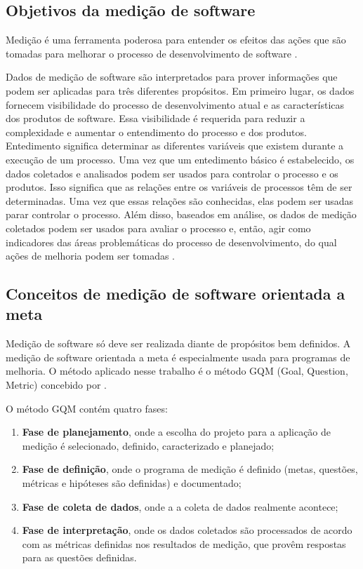 \subsection{Objetivos da medição de software}
Medição é uma ferramenta poderosa para entender os efeitos das ações que são
tomadas para melhorar o processo de desenvolvimento de software
\cite{egon}.

Dados de medição de software são interpretados para prover informações que podem
ser aplicadas para três diferentes propósitos. Em primeiro lugar, os dados
fornecem visibilidade do processo de desenvolvimento atual e as características
dos produtos de software. Essa visibilidade é requerida para reduzir a complexidade
e aumentar o entendimento do processo e dos produtos. Entedimento significa
determinar as diferentes variáveis que existem durante a execução de um processo.
Uma vez que um entedimento básico é estabelecido, os dados coletados e analisados
podem ser usados para controlar o processo e os produtos. Isso significa que as
relações entre os variáveis de processos têm de ser determinadas. Uma vez que
 essas relações são conhecidas, elas podem ser usadas parar controlar o processo.
 Além disso, baseados em análise, os dados de medição coletados podem ser usados
 para avaliar o processo e, então, agir como indicadores das áreas problemáticas
 do processo de desenvolvimento, do qual ações de melhoria podem ser tomadas
 \cite{pfleeger}.

\subsection{Conceitos de medição de software orientada a meta}
Medição de software só deve ser realizada diante de propósitos bem definidos.
A medição de software orientada a meta é especialmente usada para programas de
 melhoria. O método aplicado nesse trabalho é o método GQM (Goal, Question, Metric)
 concebido por \cite{basiliRombach}.

 O método GQM contém quatro fases:
\begin{enumerate}
  \item   \textbf{Fase de planejamento}, onde a escolha do projeto para a aplicação de
  medição é selecionado, definido, caracterizado e planejado;
  \item  \textbf{Fase de definição}, onde o programa de medição é definido (metas, questões,
  métricas e hipóteses são definidas) e documentado;
  \item  \textbf{Fase de coleta de dados}, onde a a coleta de dados realmente acontece;
  \item  \textbf{Fase de interpretação}, onde os dados coletados são processados de
  acordo com as métricas definidas nos resultados de medição, que provêm
  respostas para as questões definidas.
\end{enumerate}

